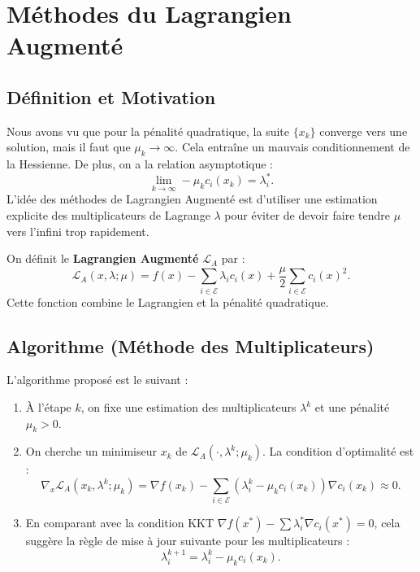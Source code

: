 \section{Méthodes du Lagrangien Augmenté}

\subsection{Définition et Motivation}

Nous avons vu que pour la pénalité quadratique, la suite $\{x_k\}$ converge vers une solution, mais il faut que $\mu_k \to \infty$. Cela entraîne un mauvais conditionnement de la Hessienne.
De plus, on a la relation asymptotique :
\[
    \lim_{k \to \infty} -\mu_k c_i(x_k) = \lambda_i^*.
\]
L'idée des méthodes de Lagrangien Augmenté est d'utiliser une estimation explicite des multiplicateurs de Lagrange $\lambda$ pour éviter de devoir faire tendre $\mu$ vers l'infini trop rapidement.

On définit le \textbf{Lagrangien Augmenté} $\mathcal{L}_A$ par :
\[
    \mathcal{L}_A(x, \lambda; \mu) = f(x) - \sum_{i \in \mathcal{E}} \lambda_i c_i(x) + \frac{\mu}{2} \sum_{i \in \mathcal{E}} c_i(x)^2.
\]
Cette fonction combine le Lagrangien et la pénalité quadratique.

\subsection{Algorithme (Méthode des Multiplicateurs)}

L'algorithme proposé est le suivant :
\begin{enumerate}
    \item À l'étape $k$, on fixe une estimation des multiplicateurs $\lambda^k$ et une pénalité $\mu_k > 0$.
    \item On cherche un minimiseur $x_k$ de $\mathcal{L}_A(\cdot, \lambda^k; \mu_k)$. La condition d'optimalité est :
    \[
        \nabla_x \mathcal{L}_A(x_k, \lambda^k; \mu_k) = \nabla f(x_k) - \sum_{i \in \mathcal{E}} (\lambda_i^k - \mu_k c_i(x_k)) \nabla c_i(x_k) \approx 0.
    \]
    \item En comparant avec la condition KKT $\nabla f(x^*) - \sum \lambda_i^* \nabla c_i(x^*) = 0$, cela suggère la règle de mise à jour suivante pour les multiplicateurs :
    \[
        \lambda_i^{k+1} = \lambda_i^k - \mu_k c_i(x_k).
    \]
\end{enumerate}

